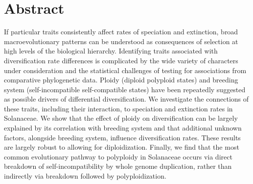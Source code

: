 \section{Abstract}

If particular traits consistently affect rates of speciation and extinction, broad macroevolutionary patterns can be understood as consequences of selection at high levels of the biological hierarchy.
Identifying traits associated with diversification rate differences is complicated by the wide variety of characters under consideration and the statistical challenges of testing for associations from comparative phylogenetic data.
Ploidy (diploid \vs polyploid states) and breeding system (self-incompatible \vs self-compatible states) have been repeatedly suggested as possible drivers of differential diversification.
We investigate the connections of these traits, including their interaction, to speciation and extinction rates in Solanaceae.
We show that the effect of ploidy on diversification can be largely explained by its correlation with breeding system and that additional unknown factors, alongside breeding system, influence diversification rates.
These results are largely robust to allowing for diploidization.
Finally, we find that the most common evolutionary pathway to polyploidy in Solanaceae occurs via direct breakdown of self-incompatibility by whole genome duplication, rather than indirectly via breakdown followed by polyploidization.
